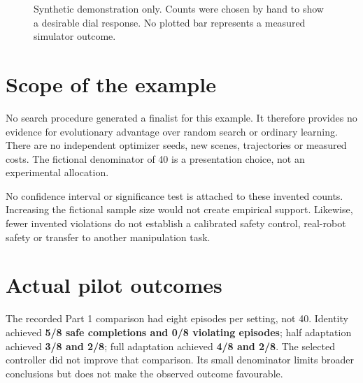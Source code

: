 \documentclass[10pt,a4paper,twocolumn]{article}
\begin{document}
\begin{figure}[ht]
\centering
{}
\caption{Synthetic demonstration only. Counts were chosen by hand to show a
desirable dial response. No plotted bar represents a measured simulator outcome.}
\end{figure}

\section{Scope of the example}
No search procedure generated a finalist for this example. It therefore provides
no evidence for evolutionary advantage over random search or ordinary learning.
There are no independent optimizer seeds, new scenes, trajectories or measured costs.
The fictional denominator of 40 is a presentation choice, not an experimental allocation.

No confidence interval or significance test is attached to these invented counts.
Increasing the fictional sample size would not create empirical support.
Likewise, fewer invented violations do not establish a calibrated safety control,
real-robot safety or transfer to another manipulation task.

\section{Actual pilot outcomes}
The recorded Part 1 comparison had eight episodes per setting, not 40. Identity
achieved \textbf{5/8 safe completions and 0/8 violating episodes}; half adaptation
achieved \textbf{3/8 and 2/8}; full adaptation achieved \textbf{4/8 and 2/8}.
The selected controller did not improve that comparison. Its small denominator
limits broader conclusions but does not make the observed outcome favourable.
\end{document}
